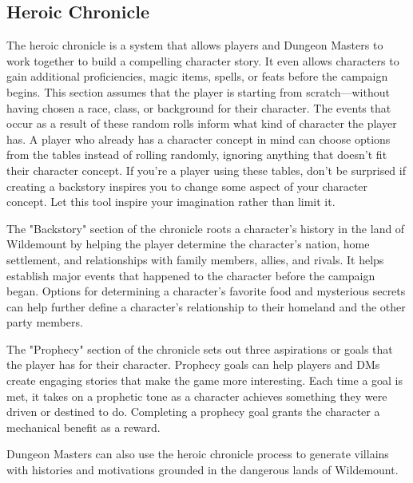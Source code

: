 \documentclass[10pt,a4paper,twoside,bg=print,twocolumn,openany,nodeprecatedcode]{dndbook}
\begin{document}
\subsection{Heroic Chronicle}
The heroic chronicle is a system that allows players and Dungeon Masters to work together to build a compelling character story. It even allows characters to gain additional proficiencies, magic items, spells, or feats before the campaign begins. This section assumes that the player is starting from scratch—without having chosen a race, class, or background for their character. The events that occur as a result of these random rolls inform what kind of character the player has. A player who already has a character concept in mind can choose options from the tables instead of rolling randomly, ignoring anything that doesn't fit their character concept. If you're a player using these tables, don't be surprised if creating a backstory inspires you to change some aspect of your character concept. Let this tool inspire your imagination rather than limit it.

The "Backstory" section of the chronicle roots a character's history in the land of Wildemount by helping the player determine the character's nation, home settlement, and relationships with family members, allies, and rivals. It helps establish major events that happened to the character before the campaign began. Options for determining a character's favorite food and mysterious secrets can help further define a character's relationship to their homeland and the other party members.

The "Prophecy" section of the chronicle sets out three aspirations or goals that the player has for their character. Prophecy goals can help players and DMs create engaging stories that make the game more interesting. Each time a goal is met, it takes on a prophetic tone as a character achieves something they were driven or destined to do. Completing a prophecy goal grants the character a mechanical benefit as a reward.

Dungeon Masters can also use the heroic chronicle process to generate villains with histories and motivations grounded in the dangerous lands of Wildemount.
\end{document}
